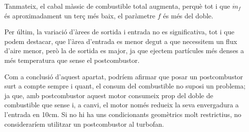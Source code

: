 \noindent Tanmateix, el cabal màssic de combustible total augmenta, perquè tot i que $ \dot{m}_f$ és aproximadament un terç més baix, el paràmetre $ f$ és més del doble.

\noindent Per últim, la variació d'àrees de sortida i entrada no es significativa, tot i que podem destacar, que l'àrea d'entrada es menor degut a que necessitem un flux d'aire menor, però la de sortida es major, ja que ejectem partícules més denses a més temperatura que sense el postcombustor.

\noindent Com a conclusió d'aquest apartat, podríem afirmar que posar un postcombustor surt a compte sempre i quant, el consum del combustible no suposi un problema; ja que, amb postcombustor aquest motor consumeix prop del doble de combustible que sense i, a canvi, el motor només redueix la seva envergadura a l'entrada en 10cm. Si no hi ha uns condicionants geomètrics molt restrictius, no consideraríem utilitzar un postcombustor al turbofan. 

